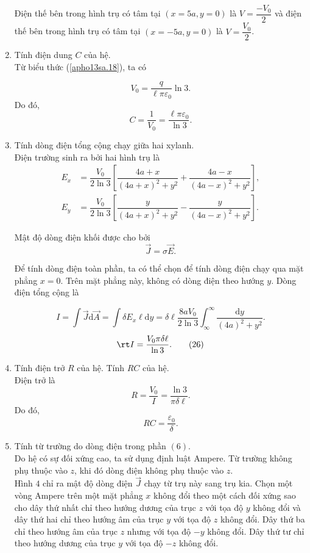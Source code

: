 \begin{loigiai}
\begin{enumerate}[1)]
  Điện thế bên trong hình trụ có tâm tại $(x=5a,y=0)$ là $V=\dfrac{-V_0}{2}$ và điện thế bên trong hình trụ có tâm tại $(x=-5a,y=0)$ là $V=\dfrac{V_0}{2}$.
    \item Tính điện dung $C$ của hệ.\\
    Từ biểu thức (\ref{apho13sa.18}), ta có
    
    \[V_0=\dfrac{q}{\ell\pi\varepsilon_0}\ln{3}. \tag{20} \label{apho13sa.20}\]
    Do đó, 
    \[C=\dfrac{1}{V_0}=\dfrac{\ell\pi\varepsilon_0}{\ln{3}}. \tag{21} \label{apho13sa.21}\]
    \item Tính dòng điện tổng cộng chạy giữa hai xylanh.\\
    Điện trường sinh ra bởi hai hình trụ là
    \begin{align*}
        E_{x}&=\dfrac{V_0}{2\ln{3}}\left[\dfrac{4a+x}{(4a+x)^2+y^2}+\dfrac{4a-x}{(4a-x)^2+y^2}\right], \tag{22} \label{apho13sa.22} \\
        E_{y}&=\dfrac{V_0}{2\ln{3}}\left[\dfrac{y}{(4a+x)^2+y^2}-\dfrac{y}{(4a-x)^2+y^2}\right]. \tag{23} \label{apho13sa.23}
    \end{align*}
    
    Mật độ dòng điện khối được cho bởi
    \[\overrightarrow{J}=\sigma\overrightarrow{E}. \tag{24} \label{apho13sa.24}\]
    
    Để tính dòng điện toàn phần, ta có thể chọn để tính dòng điện chạy qua mặt phẳng $x=0$. Trên mặt phẳng này, không có dòng điện theo hướng $y$. Dòng điện tổng cộng là
    
    \[I=\int\overrightarrow{J}\mathrm{d}\overrightarrow{A}=\int \delta E_{x}\ell\mathrm{d}y=\delta \ell \dfrac{8aV_0}{2\ln{3}}\int_\infty ^\infty\dfrac{\mathrm{d}y}{(4a)^2+y^2}. \tag{25} \label{apho13sa.25}\]
    \[\rt I=\dfrac{V_0\pi\delta\ell}{\ln{3}}. \tag{26} \label{apho13sa.26}\]

    \item Tính điện trở $R$ của hệ. Tính $RC$ của hệ.\\
    Điện trở là
    \[R=\dfrac{V_0}{I}=\dfrac{\ln{3}}{\pi\delta\ell}. \tag{27} \label{apho13sa.27}\]
    Do đó, 
    \[RC=\dfrac{\varepsilon_0}{\delta}. \tag{28} \label{apho13sa.28}\]
    
    \item Tính từ trường do dòng điện trong phần $(6)$.\\
    Do hệ có sự đối xứng cao, ta sử dụng định luật Ampere. Từ trường không phụ thuộc vào $z$, khi đó dòng điện không phụ thuộc vào $z$.\\
    Hình $4$ chỉ ra mật độ dòng điện $\overrightarrow{J}$ chạy từ trụ này sang trụ kia. Chọn một vòng Ampere trên một mặt phẳng $x$ không đổi theo một cách đối xứng sao cho dây thứ nhất chỉ theo hướng dương của trục $z$ với tọa độ $y$ không đổi và dây thứ hai chỉ theo hướng âm của trục $y$ với tọa độ $z$ không đổi. Dây thứ ba chỉ theo hướng âm của trục $z$ nhưng với tọa độ $-y$ không đổi. Dây thứ tư chỉ theo hướng dương của trục $y$ với tọa độ $-z$ không đổi.
    \begin{center}


\end{center}
\end{enumerate}
\end{loigiai}
